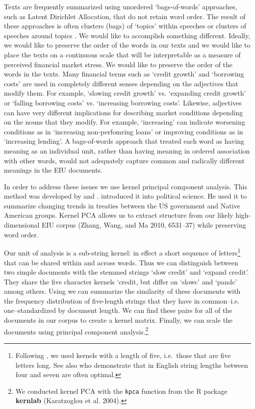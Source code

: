 \documentclass[]{article}
\begin{document}
Texts are frequently summarized using unordered `bags-of-words'
approaches, such as Latent Dirichlet Allocation, that do not retain word
order. The result of these approaches is often clusters (bags) of `topics'
within speeches or clusters of speeches around topics \citep[for a review see][]{Grimmer2013}. We would like to accomplish something different. Ideally,
we would like to preserve the order of the words in our texts and we
would like to place the texts on a continuous scale that will be
interpretable as a measure of perceived financial market stress. We
would like to preserve the order of the words in the texts. Many
financial terms such as `credit growth' and `borrowing costs' are used
in completely different senses depending on the adjectives that modify
them. For example, `slowing credit growth' vs. `expanding credit growth'
or `falling borrowing costs' vs. `increasing borrowing costs'. Likewise, adjectives can have very different implications for describing market conditions depending on the nouns that they modify. For example, `increasing' can indicate worsening conditions as in `increasing non-perfomring loans' or improving conditions as in `increasing lending'.  A
bags-of-words approach that treated each word as having meaning as an
individual unit, rather than having meaning in ordered association with
other words, would not adequately capture common and radically different
meanings in the EIU documents.

In order to address these issues we use kernel principal component
analysis. This method was developed by \cite{Scholkopf1998} and \cite{lodhi2002}. \cite{Spirling2012} introduced it into political science. He used it to summarize changing
  trends in treaties between the US government and Native American
  groups. Kernel PCA allows us to extract structure from our likely
high-dimensional EIU corpus (Zhang, Wang, and Ma 2010, 6531--37) while
preserving word order.

Our unit of analysis is a sub-string kernel: in
effect a short sequence of letters\footnote{Following \cite{Spirling2012},
  we used kernels with a length of five, i.e.~those that are five letters
  long. See also \cite{lodhi2002} who demonstrate that in English
  string lengths between four and seven are often optimal.} that can be
shared within and across words. Thus we can distinguish between two
simple documents with the stemmed strings `slow credit' and `expand
credit'. They share the five character kernels `credit, but differ on
`slowc' and `pandc' among others. Using \cite{lodhi2002} we can
summarize the similarity of these documents with the frequency
distribution of five-length strings that they have in
common--i.e. one--standardized by document length. We can find these pairs
for all of the documents in our corpus to create a kernel matrix.
Finally, we can scale the documents using principal component
analysis.\footnote{We conducted kernel PCA with the \texttt{kpca}
  function from the R package \textbf{kernlab} (Karatzoglou et al.
  2004).}
\end{document}
